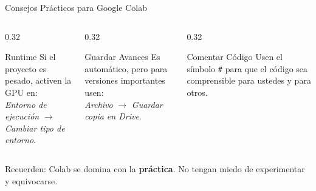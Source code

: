 \documentclass[aspectratio=169]{beamer}
\newcommand{\tech}[1]{\texttt{\textcolor{mainColor}{#1}}}
\begin{document}
\begin{frame}{Consejos Prácticos para Google Colab}
  \begin{columns}[T]
    \begin{column}{0.32\textwidth}
      \begin{conceptbox}{\faTachometerAlt\enspace Runtime}
        \small
        Si el proyecto es pesado, activen la GPU en:\\[3pt]
        \textit{Entorno de ejecución} $\rightarrow$
        \textit{Cambiar tipo de entorno}.
      \end{conceptbox}
    \end{column}
    \begin{column}{0.32\textwidth}
      \begin{conceptbox}{\faSave\enspace Guardar Avances}
        \small
        Es automático, pero para versiones importantes usen:\\[3pt]
        \textit{Archivo} $\rightarrow$
        \textit{Guardar copia en Drive}.
      \end{conceptbox}
    \end{column}
    \begin{column}{0.32\textwidth}
      \begin{conceptbox}{\faCommentDots\enspace Comentar Código}
        \small
        Usen el símbolo \tech{\#} para que el código sea
        comprensible para ustedes y para otros.
      \end{conceptbox}
    \end{column}
  \end{columns}
  \vspace{0.3cm}
  \centering\small
  Recuerden: Colab se domina con la \textbf{práctica}.
  No tengan miedo de experimentar y equivocarse.
\end{frame}

\end{document}
